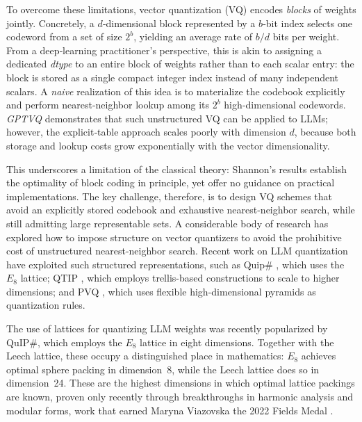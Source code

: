 \documentclass{article}
\theoremstyle{plain}
\theoremstyle{definition}
\theoremstyle{remark}
\begin{document}
To overcome these limitations, vector quantization (VQ) \citep{gersho2012vector} encodes \emph{blocks} of weights jointly. Concretely, a $d$‑dimensional block represented by a $b$‑bit index selects one codeword from a set of size $2^{b}$, yielding an average rate of $b/d$ bits per weight. From a deep‑learning practitioner’s perspective, this is akin to assigning a dedicated \emph{dtype} to an entire block of weights rather than to each scalar entry: the block is stored as a single compact integer index instead of many independent scalars. A \emph{naive} realization of this idea is to materialize the codebook explicitly and perform nearest‑neighbor lookup among its $2^{b}$ high‑dimensional codewords. \emph{GPTVQ} \citep{van2024gptvq} demonstrates that such unstructured VQ can be applied to LLMs; however, the explicit‑table approach scales poorly with dimension $d$, because both storage and lookup costs grow exponentially with the vector dimensionality.


This underscores a limitation of the classical theory: Shannon’s results establish the optimality of block coding in principle, yet offer no guidance on practical implementations. The key challenge, therefore, is to design VQ schemes that avoid an explicitly stored codebook and exhaustive nearest-neighbor search, while still admitting large representable sets. A considerable body of research has explored how to impose structure on vector quantizers to avoid the prohibitive cost of unstructured nearest‑neighbor search. Recent work on LLM quantization have exploited such structured representations, such as Quip\# \citep{tseng2024quip}, which uses the $E_8$ lattice; QTIP \citep{tseng2024qtip}, which employs trellis-based constructions to scale to higher dimensions; and PVQ \citep{van2024pyramid}, which uses flexible high-dimensional pyramids as quantization rules.

The use of lattices for quantizing LLM weights was recently popularized by QuIP\#, which employs the $E_8$ lattice in eight dimensions. Together with the Leech lattice, these occupy a distinguished place in mathematics: $E_8$ achieves optimal sphere packing in dimension~8, while the Leech lattice does so in dimension~24. These are the highest dimensions in which optimal lattice packings are known, proven only recently through breakthroughs in harmonic analysis and modular forms, work that earned Maryna Viazovska the 2022 Fields Medal \citep{IMU_FieldsMedals_2022}.

\end{document}
